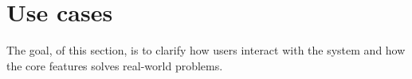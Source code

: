 \chapter{Use cases}\label{ch:use-cases}
The goal, of this section, is to clarify how users interact with the system
and how the core features solves real-world problems.



